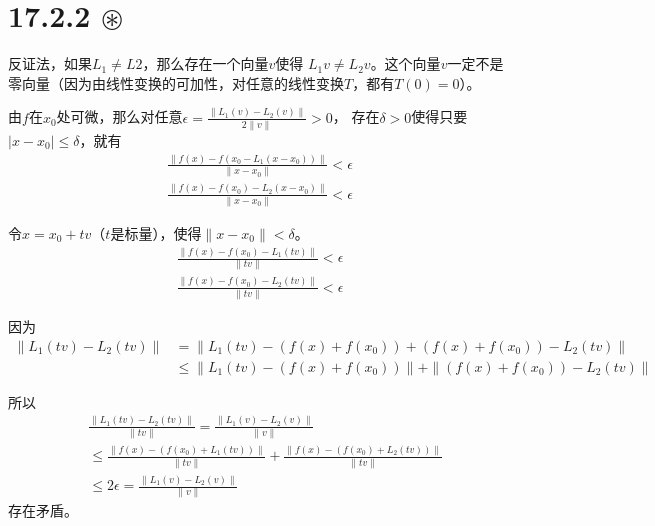 \documentclass{article}
\begin{document}
\section*{17.2.2 $\circledast$} 

反证法，如果$L_1 \neq L2$，那么存在一个向量$v$使得
$L_1v \neq L_2v$。这个向量$v$一定不是零向量（因为由线性变换的可加性，对任意的线性变换$T$，都有$T(0) = 0$）。

由$f$在$x_0$处可微，那么对任意$\epsilon = \frac{\|L_1(v) - L_2(v)\|}{2\|v\|} > 0$，
存在$\delta > 0$使得只要$|x - x_0| \leq \delta$，就有
\begin{align*}
  \frac{\|f(x) - f(x_0 - L_1(x - x_0))\|}{\|x - x_0\|} < \epsilon \\
  \frac{\|f(x) - f(x_0) - L_2(x - x_0)\|}{\|x - x_0\|} < \epsilon
\end{align*}

令$x = x_0 + tv$（$t$是标量），使得$\|x - x_0\| < \delta$。
\begin{align*}
  \frac{\|f(x) - f(x_0) - L_1(tv)\|}{\|tv\|} < \epsilon \\
  \frac{\|f(x) - f(x_0) - L_2(tv)\|}{\|tv\|} < \epsilon
\end{align*}

因为
\begin{align*}
  \|L_1(tv) - L_2(tv)\| & = \|L_1(tv) - (f(x) + f(x_0)) + (f(x) + f(x_0)) - L_2(tv)\|        \\
                        & \leq \|L_1(tv) - (f(x) + f(x_0))\| + \|(f(x) + f(x_0)) - L_2(tv)\|
\end{align*}

所以
\begin{align*}
   & \frac{\|L_1(tv) - L_2(tv)\|}{\|tv\|} = \frac{\|L_1(v) - L_2(v)\|}{\|v\|}                                                              \\
   & \leq \frac{\|f(x) - (f(x_0) + L_1(tv))\|}{\|tv\|} + \frac{\|f(x) - (f(x_0) + L_2(tv))\|}{\|tv\|} \\
   & \leq 2\epsilon = \frac{\|L_1(v) - L_2(v)\|}{\|v\|}
\end{align*}
存在矛盾。
\end{document}
